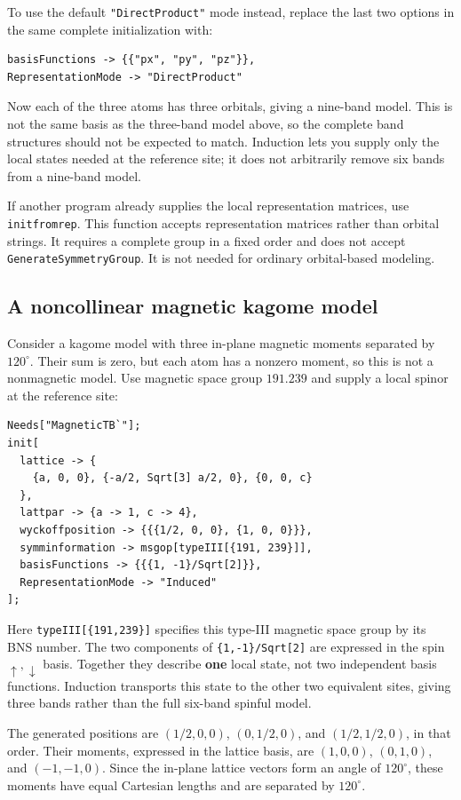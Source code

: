 \documentclass[titlepage,a4paper,12pt]{article}
\begin{document}
To use the default \lstinline|"DirectProduct"| mode instead, replace the
last two options in the same complete initialization with:
\begin{lstlisting}[numbers=none]
basisFunctions -> {{"px", "py", "pz"}},
RepresentationMode -> "DirectProduct"
\end{lstlisting}
Now each of the three atoms has three orbitals, giving a nine-band model.
This is not the same basis as the three-band model above, so the complete
band structures should not be expected to match.
Induction lets you supply only the local states needed at the reference site;
it does not arbitrarily remove six bands from a nine-band model.

If another program already supplies the local representation matrices, use
\lstinline|initfromrep|. This function accepts representation matrices rather
than orbital strings. It requires a complete group in a fixed order and does
not accept \lstinline|GenerateSymmetryGroup|.
It is not needed for ordinary orbital-based modeling.

\subsection{A noncollinear magnetic kagome model}
\label{sec:kagome}
Consider a kagome model with three in-plane magnetic moments separated by
$120^\circ$. Their sum is zero, but each atom has a nonzero moment, so this
is not a nonmagnetic model. Use magnetic space group $191.239$ and supply a
local spinor at the reference site:
\begin{lstlisting}
Needs["MagneticTB`"];
init[
  lattice -> {
    {a, 0, 0}, {-a/2, Sqrt[3] a/2, 0}, {0, 0, c}
  },
  lattpar -> {a -> 1, c -> 4},
  wyckoffposition -> {{{1/2, 0, 0}, {1, 0, 0}}},
  symminformation -> msgop[typeIII[{191, 239}]],
  basisFunctions -> {{{1, -1}/Sqrt[2]}},
  RepresentationMode -> "Induced"
];
\end{lstlisting}
Here \lstinline|typeIII[{191,239}]| specifies this type-III magnetic space
group by its BNS number.
The two components of \lstinline|{1,-1}/Sqrt[2]| are expressed in the spin
$\uparrow,\downarrow$ basis. Together they describe \textbf{one} local state,
not two independent basis functions.
Induction transports this state to the other two equivalent sites, giving
three bands rather than the full six-band spinful model.

The generated positions are $(1/2,0,0)$, $(0,1/2,0)$, and $(1/2,1/2,0)$,
in that order. Their moments, expressed in the lattice basis, are $(1,0,0)$,
$(0,1,0)$, and $(-1,-1,0)$. Since the in-plane lattice vectors form an angle
of $120^\circ$, these moments have equal Cartesian lengths and are separated
by $120^\circ$.
\end{document}
